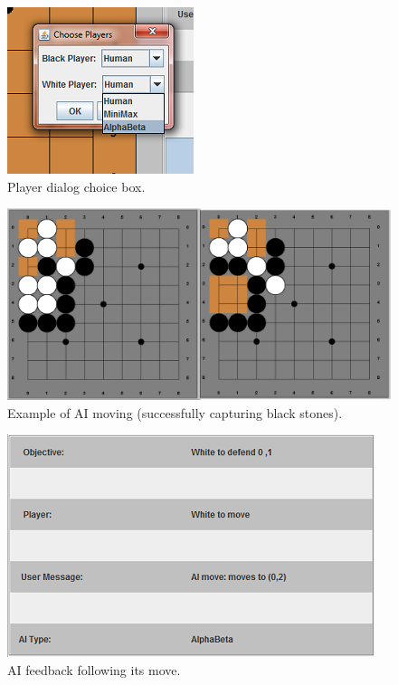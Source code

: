 \documentclass{l3proj}
\begin{document}
\begin{figure}[H]
\centering
\includegraphics[scale=1]{Images/GUI-8-PlayerChoice.png}
\caption{Player dialog choice box.}
\end{figure}

\begin{figure}[H]
\centering
\includegraphics[scale=0.5]{Images/GUI-9-AIMove1.png}
\caption{Example of AI moving (successfully capturing black stones).}
\end{figure}

\begin{figure}[H]
\centering
\includegraphics[scale=1]{Images/GUI-11-AIMove3Feedback.png}
\caption{AI feedback following its move.}
\end{figure}
\end{document}
